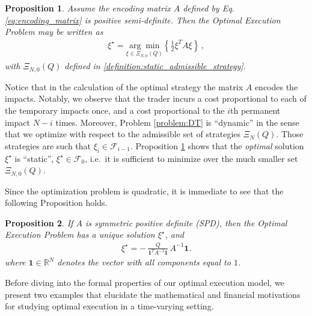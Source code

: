 \documentclass[final,3p,authoryear,12pt]{elsarticle}
\newtheorem{remark}{Remark}
\newtheorem{proposition}{Proposition}
\begin{document}
\begin{proposition}
\label{proposition:CostFunctionDT}
Assume the encoding matrix \(A\) defined by Eq. \ref{eq:encoding_matrix}
is positive semi-definite. Then the Optimal Execution Problem may be written as 
\begin{align}
    \xi^{\star} = \underset{\xi \in \Xi_{N,0}(Q)}{\arg \min}
    \left\{ \frac{1}{2}\xi^{T}A\xi\right\}\,,
\end{align}
with $\Xi_{N,0}(Q)$ defined in \ref{definition:static_admissible_strategy}.
\end{proposition}
Notice that in the calculation of the optimal strategy the matrix $A$ encodes
the impacts. Notably, we observe that the trader incurs a cost proportional to
each of the temporary impacts once, and a cost proportional to the $i$th
permanent impact $N-i$ times. Moreover, Problem \eqref{problem:DT} is ``dynamic''
in the sense that we optimize with respect to the admissible set of strategies
$\Xi_{N}(Q)$. Those strategies are such that $\xi_i\in\mathcal{F}_{i-1}$.
Proposition \ref{proposition:CostFunctionDT} shows that the \emph{optimal}
solution $\xi^{\star}$ is ``static'', $\xi^{\star} \in \mathcal{F}_0$, i.e.\ it
is sufficient to minimize over the much smaller set $\Xi_{N,0}(Q)$.

Since the optimization problem is quadratic, it is immediate to see that the following Proposition holds.

\begin{proposition}
\label{proposition:DTProblemOptimalsolution}
If $A$ is symmetric positive definite (SPD), then the Optimal Execution
Problem has a unique solution $\xi^{\star}$, and 
\begin{eqnarray}
    \xi^{\star}= -\,\frac{Q}{\pmb{1}^{T}A^{-1}\pmb{1}}\, A^{-1}\pmb{1}.
\end{eqnarray}
where $\pmb{1}\in\mathbb{R}^{N}$ denotes the vector with all components equal
to $1$.
\end{proposition}

Before diving into the formal properties of our optimal execution model, we present two examples that elucidate the mathematical and financial motivations for studying optimal execution in a time-varying setting.
\end{document}
